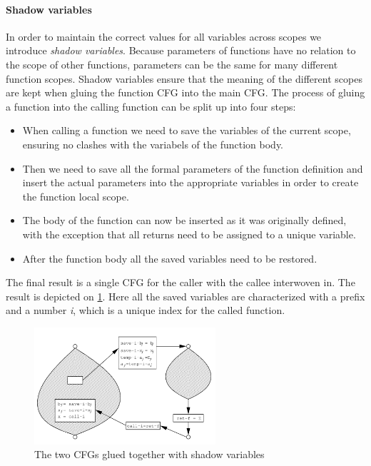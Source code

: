 \paragraph{Shadow variables}
In order to maintain the correct values for all variables across scopes we introduce \emph{shadow variables}.
Because parameters of functions have no relation to the scope of other functions, parameters can be the same for many different function scopes.
Shadow variables ensure that the meaning of the different scopes are kept when gluing the function CFG into the main CFG.
The process of gluing a function into the calling function can be split up into four steps:
\begin{itemize}
\item When calling a function we need to save the variables of the current scope, ensuring no clashes with the variabels of the function body.
\item Then we need to save all the formal parameters of the function definition and insert the actual parameters into the appropriate variables in order to create the function local scope.
\item The body of the function can now be inserted as it was originally defined, with the exception that all returns need to be assigned to a unique variable.
\item After the function body all the saved variables need to be restored.
\end{itemize}

The final result is a single CFG for the caller with the callee interwoven in.
The result is depicted on \cref{interprocedural_glue}.
Here all the saved variables are characterized with a prefix and a number \emph{i}, which is a unique index for the called function.


\begin{figure}[H]
  \center
  \includegraphics[width=0.6\textwidth]{figures/interprocedural_glue}
  \caption{The two CFGs glued together with shadow variables}
  \label{interprocedural_glue}
\end{figure}

